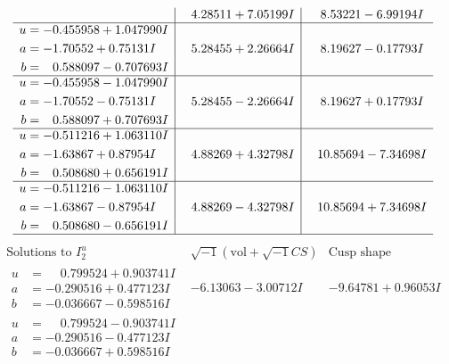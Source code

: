 \documentclass[1p]{elsarticle_modified}
\theoremstyle{definition}
\newcommand{\I}{\sqrt{-1}}
\begin{document}
$$\begin{array}{c|c|c}
 & \phantom{-}4.28511 + 7.05199 I & \phantom{-}8.53221 - 6.99194 I \\ \hline\begin{aligned}
u &= -0.455958 + 1.047990 I \\
a &= -1.70552 + 0.75131 I \\
b &= \phantom{-}0.588097 - 0.707693 I\end{aligned}
 & \phantom{-}5.28455 + 2.26664 I & \phantom{-}8.19627 - 0.17793 I \\ \hline\begin{aligned}
u &= -0.455958 - 1.047990 I \\
a &= -1.70552 - 0.75131 I \\
b &= \phantom{-}0.588097 + 0.707693 I\end{aligned}
 & \phantom{-}5.28455 - 2.26664 I & \phantom{-}8.19627 + 0.17793 I \\ \hline\begin{aligned}
u &= -0.511216 + 1.063110 I \\
a &= -1.63867 + 0.87954 I \\
b &= \phantom{-}0.508680 + 0.656191 I\end{aligned}
 & \phantom{-}4.88269 + 4.32798 I & \phantom{-}10.85694 - 7.34698 I \\ \hline\begin{aligned}
u &= -0.511216 - 1.063110 I \\
a &= -1.63867 - 0.87954 I \\
b &= \phantom{-}0.508680 - 0.656191 I\end{aligned}
 & \phantom{-}4.88269 - 4.32798 I & \phantom{-}10.85694 + 7.34698 I\\
 \hline 
 \end{array}$$\newpage$$\begin{array}{c|c|c}  
\text{Solutions to }I^u_{2}& \I (\text{vol} + \sqrt{-1}CS) & \text{Cusp shape}\\
 \hline 
\begin{aligned}
u &= \phantom{-}0.799524 + 0.903741 I \\
a &= -0.290516 + 0.477123 I \\
b &= -0.036667 - 0.598516 I\end{aligned}
 & -6.13063 - 3.00712 I & -9.64781 + 0.96053 I \\ \hline\begin{aligned}
u &= \phantom{-}0.799524 - 0.903741 I \\
a &= -0.290516 - 0.477123 I \\
b &= -0.036667 + 0.598516 I\end{aligned}

\end{array}$$
\end{document}
